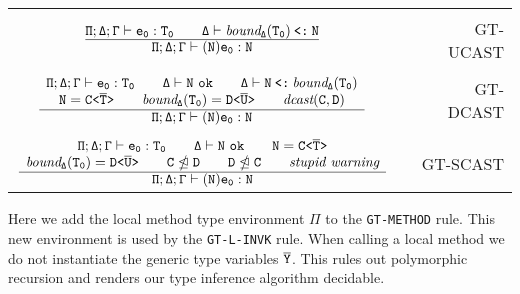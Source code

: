 {\begin{minipage}{\textwidth}
\begin{small}
\begin{tabularx}{\textwidth}{c X r}
& \\

$\frac{\displaystyle \mathtt{\Pi;\Delta;\Gamma \vdash e_0 : T_0 \quad \quad \Delta \vdash \textit{bound}_\Delta(T_0) \mathbin{\texttt{<:}}  N}}{\displaystyle \mathtt{\Pi;\Delta;\Gamma \vdash (N) e_0 : N}}
$ & & GT-UCAST \\

& \\

$ \ddfrac{\begin{array}{c}
  \mathtt{\environmentvdash e_0 : T_0 \quad \quad \Delta \vdash N\ \texttt{ok} \quad \quad \Delta \vdash N \subeq  \textit{bound}_\Delta(T_0) } \\
  \mathtt{N = \exptype{C}{\ol{T}} \quad \quad \textit{bound}_\Delta(T_0) = \exptype{D}{\ol{U}}  \quad \quad \textit{dcast}(C,D)}
\end{array}
}{\mathtt{\environmentvdash (N) e_0 : N}}$ & & GT-DCAST \\

& \\

$\ddfrac{\begin{array}{c}
  \mathtt{\environmentvdash e_0 : T_0 \quad \quad \Delta \vdash N\ \texttt{ok} \quad \quad N = \exptype{C}{\ol{T}}  } \\
  \mathtt{\textit{bound}_\Delta(T_0) = \exptype{D}{\ol{U}} \quad \quad C \ntrianglelefteq D \quad \quad D \ntrianglelefteq C \quad \quad \textit{stupid warning}}
\end{array}}
{\mathtt{\environmentvdash (N) e_0 : N}}
$ & & GT-SCAST 
\end{tabularx}
\end{small}
\end{minipage}
}

\smallskip

Here we add the local method type environment $\mathtt{\Pi}$ to the \texttt{GT-METHOD} rule.
This new environment is used by the \texttt{GT-L-INVK} rule.
When calling a local method we do not instantiate the generic type variables $\mathtt{\overline{\tt Y}}$.
This rules out polymorphic recursion and renders our type inference algorithm decidable.

\smallskip

